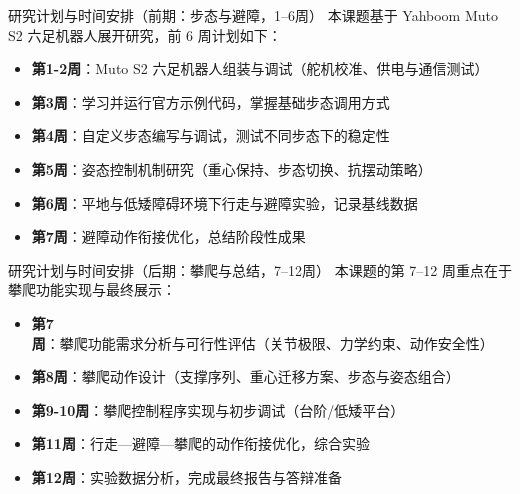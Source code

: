 \documentclass{beamer}
\begin{document}
\begin{frame}{研究计划与时间安排（前期：步态与避障，1--6周）}
    本课题基于 Yahboom Muto S2 六足机器人展开研究，前 6 周计划如下：
    \begin{itemize}
        \item \textbf{第1-2周}：Muto S2 六足机器人组装与调试（舵机校准、供电与通信测试）
        \item \textbf{第3周}：学习并运行官方示例代码，掌握基础步态调用方式
        \item \textbf{第4周}：自定义步态编写与调试，测试不同步态下的稳定性
        \item \textbf{第5周}：姿态控制机制研究（重心保持、步态切换、抗摆动策略）
        \item \textbf{第6周}：平地与低矮障碍环境下行走与避障实验，记录基线数据
        \item \textbf{第7周}：避障动作衔接优化，总结阶段性成果
    \end{itemize}
\end{frame}

\begin{frame}{研究计划与时间安排（后期：攀爬与总结，7--12周）}
    本课题的第 7--12 周重点在于攀爬功能实现与最终展示：
    \begin{itemize}
        \item \textbf{第7周}：攀爬功能需求分析与可行性评估（关节极限、力学约束、动作安全性）
        \item \textbf{第8周}：攀爬动作设计（支撑序列、重心迁移方案、步态与姿态组合）
        \item \textbf{第9-10周}：攀爬控制程序实现与初步调试（台阶/低矮平台）
        \item \textbf{第11周}：行走—避障—攀爬的动作衔接优化，综合实验
        \item \textbf{第12周}：实验数据分析，完成最终报告与答辩准备
    \end{itemize}
\end{frame}



\end{document}
